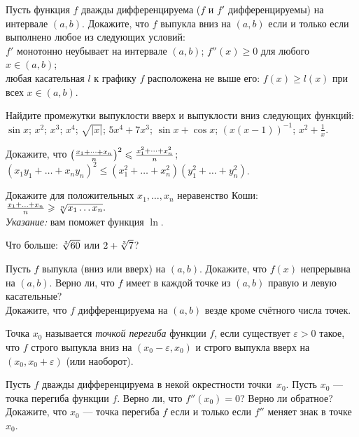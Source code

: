 \documentclass[a4paper, 12pt]{article}
\newcommand{\0}[1]{\overline{#1}}
\begin{document}
 Пусть функция $f$ дважды дифференцируема ($f$ и $f'$ дифференцируемы) на
интервале $(a,b)$.  Докажите, что $f$ выпукла вниз на $(a,b)$ если и только если выполнено любое из следующих условий:\\
$f'$ монотонно неубывает на интервале $(a,b)$;\qquad
{}
$f''(x)\geqslant0$ для любого $x\in(a,b)$;\\
любая касательная $l$ к графику $f$ расположена не выше его:
$f(x)\geqslant l(x)$ при всех $x\in(a,b)$.

 Найдите промежутки выпуклости вверх и выпуклости вниз
следующих функций:\\
 $\sin x$;
 $x^2$;
 $x^3$;
 $x^4$;
 $\sqrt{|x|}$;
  $5x^4+7x^3$;
 $\sin x+\cos x$;
 $(x(x-1))^{-1}$;
 $x^2+\frac1x$.

 Докажите, что %
$\left({x_1+\dots+x_n\over n}\right)^2\leqslant
{x_1^2+\dots+x_n^2\over n}$; %
$(x_1y_1+\dots+x_ny_n)^2\leqslant(x_1^2+\dots+x_n^2)(y_1^2+\dots+y_n^2)$.

Докажите для положительных $x_1,\ldots,x_n$ неравенство Коши: $\frac{x_1+\ldots+x_n}n\geq \root n \of {x_1\ldots x_n}.$\\
{\em Указание:} вам поможет функция $\ln$.


Что больше: $\root 3 \of{60}$ или $2+\root 3 \of 7$?

Пусть $f$ выпукла (вниз или вверх) на $(a,b)$.  Докажите, что $f(x)$ непрерывна на $(a,b)$.
 Верно ли, что $f$ имеет в каждой точке из $(a,b)$ правую и левую касательные?\\
 Докажите, что $f$ дифференцируема на $(a,b)$ везде кроме счётного числа точек.


 Точка $x_0$ называется {\it точкой перегиба} функции $f$, если
существует $\varepsilon>0$ такое, что $f$ строго выпукла вниз
на $(x_0-\varepsilon,x_0)$ и строго выпукла вверх на $(x_0,x_0+\varepsilon)$
(или наоборот).

 Пусть $f$ дважды дифференцируема в некой окрестности точки~$x_0$.
Пусть $x_0$ --- точка перегиба функции $f$.
Верно ли, что $f''(x_0)=0$? Верно ли обратное? %
Докажите, что $x_0$ --- точка перегиба $f$ если и только если
$f''$ меняет знак в точке $x_0$.
\end{document}
